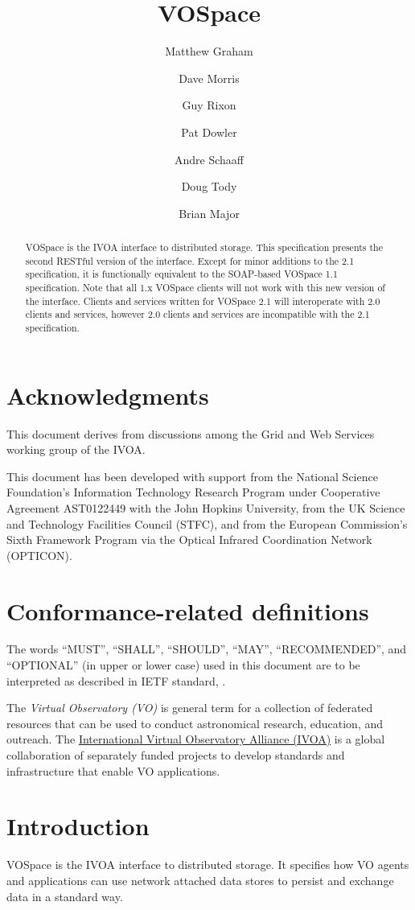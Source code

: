 \documentclass[11pt,a4paper]{ivoa}
\title{VOSpace}
\author{Matthew Graham}
\author{Dave Morris}
\author{Guy Rixon}
\author{Pat Dowler}
\author{Andre Schaaff}
\author{Doug Tody}
\author{Brian Major}
\begin{document}
\begin{abstract}
VOSpace is the IVOA interface to distributed storage. This specification presents the second RESTful version of the interface.  Except for minor additions to the 2.1 specification, it is functionally equivalent to the SOAP-based VOSpace 1.1 specification. Note that all 1.x VOSpace clients will not work with this new version of the interface.  Clients and services written for VOSpace 2.1 will interoperate with 2.0 clients and services, however 2.0 clients and services are incompatible with the 2.1 specification.
\end{abstract}

\section*{Acknowledgments}
This document derives from discussions among the Grid and Web Services working group of the IVOA.

This document has been developed with support from the National Science Foundation's Information Technology Research Program under Cooperative Agreement AST0122449 with the John Hopkins University, from the UK Science and Technology Facilities Council (STFC), and from the European Commission's Sixth Framework Program via the Optical Infrared Coordination Network (OPTICON).

\section*{Conformance-related definitions}
The words ``MUST'', ``SHALL'', ``SHOULD'', ``MAY'', ``RECOMMENDED'', and
``OPTIONAL'' (in upper or lower case) used in this document are to be
interpreted as described in IETF standard, \citet{std:RFC2119}.

The \emph{Virtual Observatory (VO)} is
general term for a collection of federated resources that can be used
to conduct astronomical research, education, and outreach.
The \href{http://www.ivoa.net}{International
Virtual Observatory Alliance (IVOA)} is a global
collaboration of separately funded projects to develop standards and
infrastructure that enable VO applications.

\section{Introduction}
VOSpace is the IVOA interface to distributed storage. It specifies how VO agents and applications can use network attached data stores to persist and exchange data in a standard way.
\end{document}

